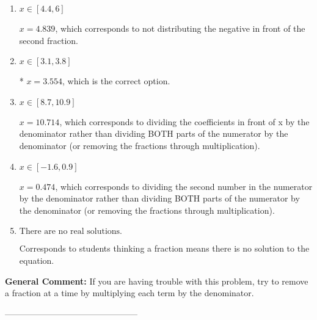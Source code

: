 \documentclass{extbook}[14pt]
\begin{document}
\begin{enumerate}[label=\Alph*.] 
\item $ x \in [4.4, 6] $ 

  $x = 4.839$, which corresponds to not distributing the negative in front of the second fraction. 
\item $ x \in [3.1, 3.8] $ 

 * $x = 3.554$, which is the correct option. 
\item $ x \in [8.7, 10.9] $ 

  $x = 10.714$, which corresponds to dividing the coefficients in front of x by the denominator rather than dividing BOTH parts of the numerator by the denominator (or removing the fractions through multiplication). 
\item $ x \in [-1.6, 0.9] $ 

  $x = 0.474$, which corresponds to dividing the second number in the numerator by the denominator rather than dividing BOTH parts of the numerator by the denominator (or removing the fractions through multiplication). 
\item $ \text{There are no real solutions.} $ 

 Corresponds to students thinking a fraction means there is no solution to the equation. 
\end{enumerate} 
 
\textbf{General Comment:} If you are having trouble with this problem, try to remove a fraction at a time by multiplying each term by the denominator. 

-----------------------------------------------
\end{document}
